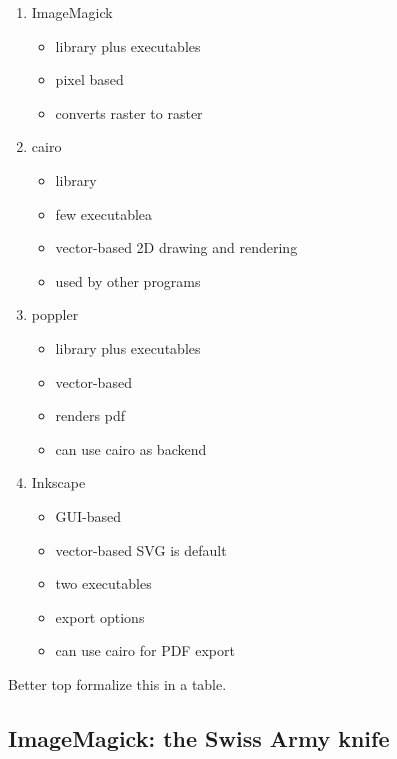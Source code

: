 \documentclass[
  11pt,
  british,
  a4paper,
]{article}
\providecommand{\tightlist}{%
  \setlength{\itemsep}{0pt}\setlength{\parskip}{0pt}}
\begin{document}
\begin{enumerate}
\tightlist
\item
  ImageMagick

  \begin{itemize}
  \tightlist
  \item
    library plus executables
  \item
    pixel based
  \item
    converts raster to raster
  \end{itemize}
\item
  cairo

  \begin{itemize}
  \tightlist
  \item
    library
  \item
    few executablea
  \item
    vector-based 2D drawing and rendering
  \item
    used by other programs
  \end{itemize}
\item
  poppler

  \begin{itemize}
  \tightlist
  \item
    library plus executables
  \item
    vector-based
  \item
    renders pdf
  \item
    can use cairo as backend
  \end{itemize}
\item
  Inkscape

  \begin{itemize}
  \tightlist
  \item
    GUI-based
  \item
    vector-based SVG is default
  \item
    two executables
  \item
    export options
  \item
    can use cairo for PDF export
  \end{itemize}
\end{enumerate}

Better top formalize this in a table.

\hypertarget{imagemagick-the-swiss-army-knife}{%
\subsection{ImageMagick: the Swiss Army
knife}\label{imagemagick-the-swiss-army-knife}}
\end{document}
